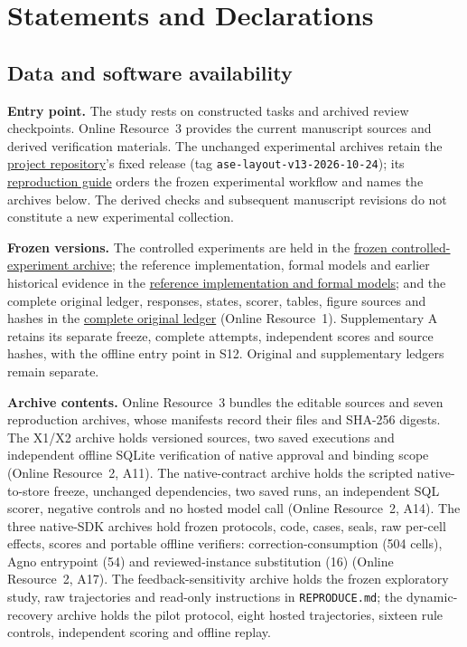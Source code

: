 \documentclass[pdflatex,sn-basic]{sn-jnl}
\begin{document}
\section*{Statements and Declarations}
\subsection*{Data and software availability}
\textbf{Entry point.} The study rests on constructed tasks and archived review checkpoints. Online Resource~3 provides the current manuscript sources and derived verification materials. The unchanged experimental archives retain the \href{https://github.com/lhh666-6/auto-dete}{project repository}'s fixed release (tag \texttt{ase-layout-v13-2026-10-24}); its \href{https://github.com/lhh666-6/auto-dete/blob/ase-layout-v13-2026-10-24/REPRODUCIBILITY.md}{reproduction guide} orders the frozen experimental workflow and names the archives below. The derived checks and subsequent manuscript revisions do not constitute a new experimental collection.

\textbf{Frozen versions.} The controlled experiments are held in the \href{https://github.com/lhh666-6/auto-dete/tree/2645e5e18c900ea91c9c980e44195dc71e410432/DKE-supplement}{frozen controlled-experiment archive}; the reference implementation, formal models and earlier historical evidence in the \href{https://github.com/lhh666-6/auto-dete/tree/c6d512843c905cab6d8521dd8c914f7fb26d85ae/latest}{reference implementation and formal models}; and the complete original ledger, responses, states, scorer, tables, figure sources and hashes in the \href{https://github.com/lhh666-6/auto-dete/tree/475e66f549613aaaaa62c2ec81ffdee483636c54/cloud-handoff}{complete original ledger} (Online Resource~1). Supplementary A retains its separate freeze, complete attempts, independent scores and source hashes, with the offline entry point in S12. Original and supplementary ledgers remain separate.

\textbf{Archive contents.} Online Resource~3 bundles the editable sources and seven reproduction archives, whose manifests record their files and SHA-256 digests. The X1/X2 archive holds versioned sources, two saved executions and independent offline SQLite verification of native approval and binding scope (Online Resource~2, A11). The native-contract archive holds the scripted native-to-store freeze, unchanged dependencies, two saved runs, an independent SQL scorer, negative controls and no hosted model call (Online Resource~2, A14). The three native-{SDK} archives hold frozen protocols, code, cases, seals, raw per-cell effects, scores and portable offline verifiers: correction-consumption (504 cells), Agno entrypoint (54) and reviewed-instance substitution (16) (Online Resource~2, A17). The feedback-sensitivity archive holds the frozen exploratory study, raw trajectories and read-only instructions in \nolinkurl{REPRODUCE.md}; the dynamic-recovery archive holds the pilot protocol, eight hosted trajectories, sixteen rule controls, independent scoring and offline replay.
\end{document}
